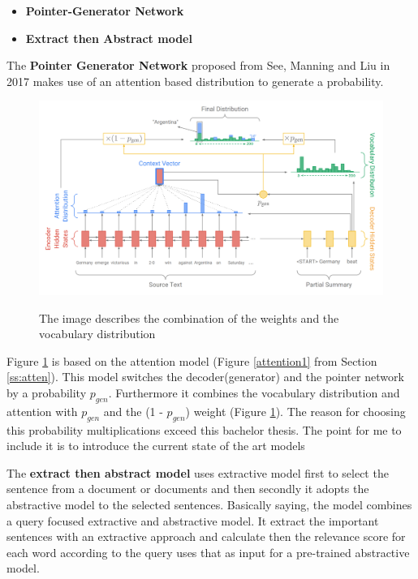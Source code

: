 \begin{itemize}
	\item \textbf{Pointer-Generator Network}
	\item \textbf{Extract then Abstract model}
\end{itemize}


The \textbf{Pointer Generator Network} proposed from See, Manning and Liu in 2017 \cite{see-etal-2017-get} makes use of an attention based distribution to generate a probability. 

\begin{figure}
	\begin{center}
		\includegraphics[width=6in]{photos/pointer}\\
		\caption{The image describes the combination of the weights and the vocabulary distribution \cite{see-etal-2017-get} }\label{pointer}
	\end{center}
\end{figure}

Figure \ref{pointer} is based on the attention model (Figure \ref{attention1} from Section \ref{ss:atten}). 
This model switches the decoder(generator) and the pointer network by a probability \(p_{gen}\).
Furthermore it combines the vocabulary distribution and attention with \(p_{gen}\) and the (1 - \(p_{gen}\)) weight (Figure \ref{pointer}). The reason for choosing this probability multiplications exceed this bachelor thesis. The point for me to include it is to introduce the current state of the art models

The \textbf{extract then abstract model} uses extractive model first to select the sentence from a document or documents and then secondly it adopts the abstractive model to the selected sentences. 
Basically saying, the model combines a query focused extractive and abstractive model. It extract the important sentences with an extractive approach and calculate then the relevance score for each word according to the query uses that as input for a pre-trained abstractive model.



